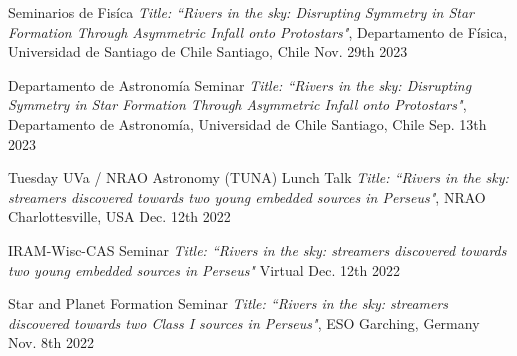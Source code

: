 


\begin{cvhonors}
	
	 \cvhonor
	{Seminarios de Fis\'ica} %
	{\textit{Title: ``Rivers in the sky:  Disrupting Symmetry in Star Formation Through Asymmetric Infall onto Protostars"}, Departamento de F\'isica, Universidad de Santiago de Chile} %
	{Santiago, Chile} %
	{Nov. 29th 2023} %
	
		 \cvhonor
	{Departamento de Astronom\'ia Seminar} %
	{\textit{Title: ``Rivers in the sky:  Disrupting Symmetry in Star Formation Through Asymmetric Infall onto Protostars"}, Departamento de Astronom\'ia, Universidad de Chile} %
	{Santiago, Chile} %
	{Sep. 13th 2023} %
	
	 \cvhonor
	{Tuesday UVa / NRAO Astronomy (TUNA) Lunch Talk} %
	{\textit{Title: ``Rivers in the sky: streamers discovered towards two young embedded sources in Perseus"}, NRAO} %
	{Charlottesville, USA} %
	{Dec. 12th 2022} %
	
	 \cvhonor
	{IRAM-Wisc-CAS Seminar} %
	{\textit{Title: ``Rivers in the sky: streamers discovered towards two young embedded sources in Perseus"}} %
	{Virtual} %
	{Dec. 12th 2022} %
	
	 \cvhonor
	{Star and Planet Formation Seminar} %
	{\textit{Title: ``Rivers in the sky: streamers discovered towards two Class I sources in Perseus"}, ESO} %
	{Garching, Germany} %
	{Nov. 8th 2022} %
	
\end{cvhonors}


